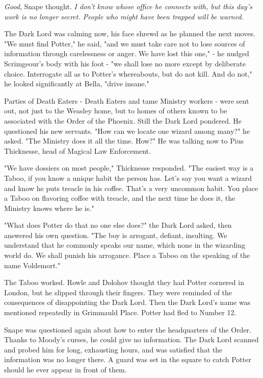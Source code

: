 \emph{Good}, Snape thought. \emph{I don't know whose office he connects with, but this day's work is no longer secret. People who might have been trapped will be warned.}

The Dark Lord was calming now, his face shrewd as he planned the next moves. "We must find Potter," he said, "and we must take care not to lose sources of information through carelessness or anger. We have lost this one," - he nudged Scrimgeour's body with his foot - "we shall lose no more except by deliberate choice. Interrogate all as to Potter's whereabouts, but do not kill. And do not," he looked significantly at Bella, "drive insane."

Parties of Death Eaters - Death Eaters and tame Ministry workers - were sent out, not just to the Weasley home, but to homes of others known to be associated with the Order of the Phoenix. Still the Dark Lord pondered. He questioned his new servants. "How can we locate one wizard among many?" he asked. "The Ministry does it all the time. How?" He was talking now to Pius Thicknesse, head of Magical Law Enforcement.

"We have dossiers on most people," Thicknesse responded. "The easiest way is a Taboo, if you know a unique habit the person has. Let's say you want a wizard and know he puts treacle in his coffee. That's a very uncommon habit. You place a Taboo on flavoring coffee with treacle, and the next time he does it, the Ministry knows where he is."

"What does Potter do that no one else does?" the Dark Lord asked, then answered his own question. "The boy is arrogant, defiant, insulting. We understand that he commonly speaks our name, which none in the wizarding world do. We shall punish his arrogance. Place a Taboo on the speaking of the name Voldemort."

The Taboo worked. Rowle and Dolohov thought they had Potter cornered in London, but he slipped through their fingers. They were reminded of the consequences of disappointing the Dark Lord. Then the Dark Lord's name was mentioned repeatedly in Grimmauld Place. Potter had fled to Number 12.

Snape was questioned again about how to enter the headquarters of the Order. Thanks to Moody's curses, he could give no information. The Dark Lord scanned and probed him for long, exhausting hours, and was satisfied that the information was no longer there. A guard was set in the square to catch Potter should he ever appear in front of them.

